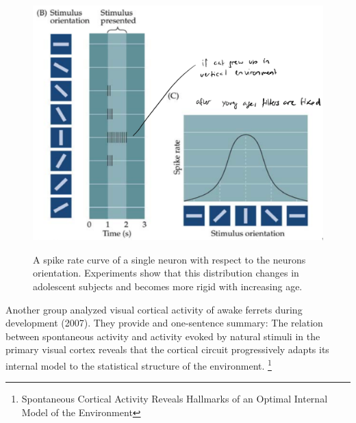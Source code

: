 \documentclass[main]{subfiles}
\begin{document}
\begin{figure}[H]
	\centering
	\includegraphics[width=0.5\linewidth]{07_UnsupervisedAndSelfsupervisedLearning/figures/orientation-neurons.png}
	\label{fig:orientation-neurons}
	\caption{A spike rate curve of a single neuron with respect to the neurons orientation. Experiments show that this distribution changes in adolescent subjects and becomes more rigid with increasing age.}
\end{figure}

Another group analyzed visual cortical activity of awake ferrets during development (2007). They provide and one-sentence summary: The relation between spontaneous activity and activity evoked by natural stimuli in the primary visual cortex reveals that the cortical circuit progressively adapts its internal model to the statistical structure of the environment. \footnote{Spontaneous Cortical Activity Reveals Hallmarks of an Optimal
Internal Model of the Environment}
\end{document}

